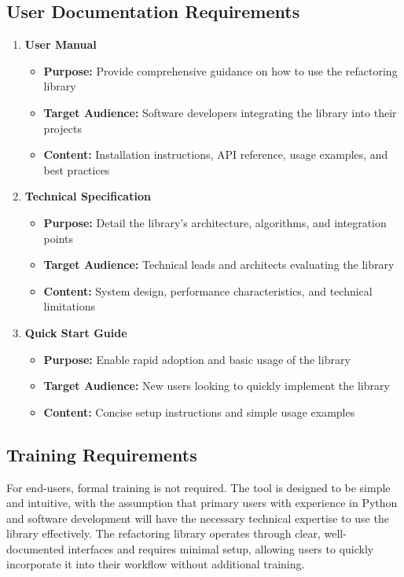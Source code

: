 \documentclass[12pt]{article}
\begin{document}
\subsection{User Documentation Requirements}
\begin{enumerate}
  \item \textbf{User Manual}
    \begin{itemize}
      \item \textbf{Purpose:} Provide comprehensive guidance on how
        to use the refactoring library
      \item \textbf{Target Audience:} Software developers integrating
        the library into their projects
      \item \textbf{Content:} Installation instructions, API
        reference, usage examples, and best practices
    \end{itemize}

  \item \textbf{Technical Specification}
    \begin{itemize}
      \item \textbf{Purpose:} Detail the library's architecture,
        algorithms, and integration points
      \item \textbf{Target Audience:} Technical leads and architects
        evaluating the library
      \item \textbf{Content:} System design, performance
        characteristics, and technical limitations
    \end{itemize}

  \item \textbf{Quick Start Guide}
    \begin{itemize}
      \item \textbf{Purpose:} Enable rapid adoption and basic usage
        of the library
      \item \textbf{Target Audience:} New users looking to quickly
        implement the library
      \item \textbf{Content:} Concise setup instructions and simple
        usage examples
    \end{itemize}
\end{enumerate}

\subsection{Training Requirements}
For end-users, formal training is not required. The tool is designed to be simple and intuitive, 
with the assumption that primary users with experience in Python and software development will 
have the necessary technical expertise to use the library effectively. The refactoring library 
operates through clear, well-documented interfaces and requires minimal setup, allowing users to 
quickly incorporate it into their workflow without additional training.\\
\end{document}
